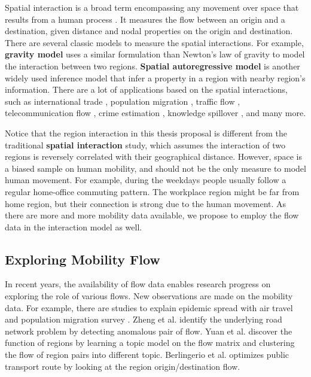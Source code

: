 Spatial interaction is a broad term encompassing any movement over space that results from a human process \cite{haynes1984gravity,rodrigue2013geography}. It measures the flow between an origin and a destination, given distance and nodal properties on the origin and destination.  There are several classic models to measure the spatial interactions. For example, \textbf{gravity model} \cite{matyas1997proper} uses a similar formulation than Newton's law of gravity to model the interaction between two regions.
\textbf{Spatial autoregressive model} \cite{anselin1980estimation} is another widely used inference model that infer a property in a region with nearby region's information. There are a lot of  applications  based on the spatial interactions, such as international trade \cite{carrere2006revisiting, egger2003proper, martinez2003augmented}, population migration \cite{hanski1994metapopulation, karemera2000gravity, lewer2008gravity}, traffic flow \cite{jung2008gravity, roughan2002experience, khadaroo2008role}, telecommunication flow \cite{krings2009urban, fischer1994artificial, black1995spatial}, crime estimation \cite{anselin2000spatial, kakamu2008spatial, browning2004paradox}, knowledge spillover \cite{lesage2007knowledge, fischer2006geography}, and many more.



Notice that the region interaction in this thesis proposal is different from the traditional \textbf{spatial interaction} study, which assumes the interaction of two regions is reversely correlated with their geographical distance. However, space is a biased sample on human mobility, and should not be the only measure to model human movement. For example, during the weekdays people usually follow a regular home-office commuting pattern. The workplace region might be far from home region, but their connection is strong due to the human movement. As there are more and more mobility data available, we propose to employ the flow data in the interaction model as well.







\subsection{Exploring Mobility Flow}

In recent years, the availability of flow data enables research progress on exploring the role of various flows. New observations are made on the mobility data. For example, there are studies to explain epidemic spread with air travel \cite{huang2013global, tatem2014mapping} and population migration survey \cite{pindolia2013demographics}. Zheng et al. \cite{zheng2011urban} identify the underlying road network problem by detecting anomalous pair of flow. Yuan et al. \cite{yuan2012discovering} discover the function of regions by learning a topic model on the flow matrix and clustering the flow of region pairs into different topic.  Berlingerio et al. \cite{berlingerio2013allaboard} optimizes public transport route by looking at the region origin/destination flow. 



